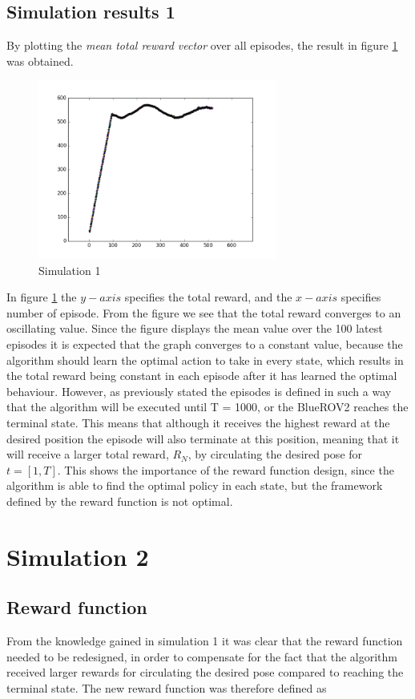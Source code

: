 \subsection*{Simulation results 1}
By plotting the \textit{mean total reward vector} over all episodes, the result in figure \ref{fig:sim1} was obtained. 
\begin{figure}[H]
    \centering
    \includegraphics[width=0.7\textwidth]{images/chap5/figure_1.png}
    \caption{Simulation 1}
    \label{fig:sim1}
\end{figure}
In figure \ref{fig:sim1} the $y-axis$ specifies the total reward, and the $x-axis$ specifies number of episode. From the figure we see that the total reward converges to an oscillating value. Since the figure displays the mean value over the 100 latest episodes it is expected that the graph converges to a constant value, because the algorithm should learn the optimal action to take in every state, which results in the total reward being constant in each episode after it has learned the optimal behaviour. However, as previously stated the episodes is defined in such a way that the algorithm will be executed until T = 1000, or the BlueROV2 reaches the terminal state. This means that although it receives the highest reward at the desired position the episode will also terminate at this position, meaning that it will receive a larger total reward, $R_{N}$, by circulating the desired pose for $t=[1,T]$. This shows the importance of the reward function design, since the algorithm is able to find the optimal policy in each state, but the framework defined by the reward function is not optimal. 
\section{Simulation 2}
\subsection*{Reward function}
From the knowledge gained in simulation 1 it was clear that the reward function needed to be redesigned, in order to compensate for the fact that the algorithm received larger rewards for circulating the desired pose compared to reaching the terminal state. The new reward function was therefore defined as

